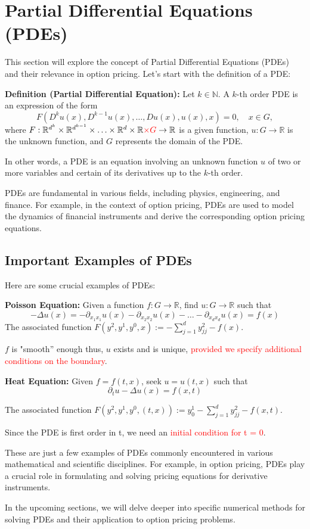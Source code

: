 \section{Partial Differential Equations (PDEs)}

This section will explore the concept of Partial Differential Equations (PDEs) and their relevance in option pricing. Let's start with the definition of a PDE:

\textbf{Definition (Partial Differential Equation):}
Let $k \in \mathbb{N}$. A $k$-th order PDE is an expression of the form
\[F(D^k u(x), D^{k-1} u(x), \ldots, Du(x), u(x), x) = 0, \quad x \in G,\]
where $F : \mathbb{R}^{d^k} \times \mathbb{R}^{d^{k-1}} \times \ldots \times \mathbb{R}^d \times \mathbb{R} \textcolor{red}{\times G} \rightarrow \mathbb{R}$ is a given function, $u : G \rightarrow \mathbb{R}$ is the unknown function, and $G$ represents the domain of the PDE.

In other words, a PDE is an equation involving an unknown function $u$ of two or more variables and certain of its derivatives up to the $k$-th order.

PDEs are fundamental in various fields, including physics, engineering, and finance. For example, in the context of option pricing, PDEs are used to model the dynamics of financial instruments and derive the corresponding option pricing equations.

\subsection{Important Examples of PDEs}

Here are some crucial examples of PDEs:

\textbf{Poisson Equation:}
Given a function $f : G \rightarrow \mathbb{R}$, find $u : G \rightarrow \mathbb{R}$ such that
\[-\Delta u(x) = -\partial_{x_1 x_1} u(x) - \partial_{x_2 x_2} u(x) - \ldots - \partial_{x_d x_d} u(x) = f(x)\]
The associated function $F(y^2, y^1, y^0, x) := -\sum_{j=1}^d y^{2}_{j j} - f(x)$.

$f$ is "smooth” enough thus, $u$ exists and is unique, \textcolor{red}{provided we specify
additional conditions on the boundary}.

\textbf{Heat Equation:}
Given $f = f(t, x)$, seek $u = u(t, x)$ such that
\[\partial_t u - \Delta u(x) = f(x, t)\]

The associated function $F(y^2, y^1, y^0, (t, x)) := y^1_0 - \sum_{j=1}^d y^{2}_{j j} - f(x, t)$.

Since the PDE is first order in t, we need an \textcolor{red}{initial condition for t = 0}.

These are just a few examples of PDEs commonly encountered in various mathematical and scientific disciplines. For example, in option pricing, PDEs play a crucial role in formulating and solving pricing equations for derivative instruments.

In the upcoming sections, we will delve deeper into specific numerical methods for solving PDEs and their application to option pricing problems.
